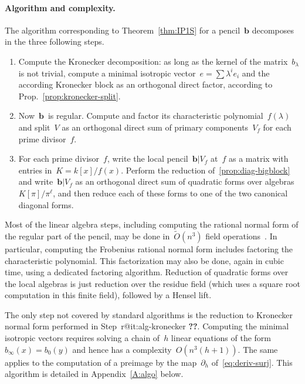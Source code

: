 \documentclass{article}%
\makeatletter
\newif\ifapx \apxtrue %
\def\labelenumi{(\roman{enumi})}
\def\itemref#1{\expandafter\ifx\csname r@#1\endcsname\relax
  {\bfseries ??}\else{\setcounter{enumi}{\ref{#1}}\labelenumi}\fi}
\def\Ot{\widetilde{O}}
\makeatother
\begin{document}
\paragraph{Algorithm and complexity.}

The algorithm corresponding to Theorem~\ref{thm:IP1S} for a
pencil~$\bm{b}$ decomposes in the three following steps.

\begin{enumerate}
\item \label{it:alg-kronecker} Compute the Kronecker decomposition: as
long as the kernel of the matrix~$b_{λ}$ is not trivial, compute a
minimal isotropic vector~$e = ∑ λ^i e_i$ and the according Kronecker
block as an orthogonal direct factor, according to
Prop.~\ref{prop:kronecker-split}.
\item \label{it:alg-factor} Now~$\bm{b}$~is regular. Compute and factor
its characteristic polynomial~$f(λ)$ and split~$V$ as an orthogonal direct
sum of primary components~$V_f$ for each prime divisor~$f$.
\item \label{it:alg-local} For each prime divisor~$f$, write the local
pencil~$\bm{b}|V_f$ at~$f$ as a matrix with entries in~$K = k[x]/f(x)$.
Perform the reduction of~\ref{prop:diag-bigblock} and write~$\bm{b}|V_f$
as an orthogonal direct sum of quadratic forms over algebras~$K[π]/π^{ℓ}$,
and then reduce each of these forms to
one of the two canonical diagonal forms.
\end{enumerate}

Most of the linear algebra steps, including computing the
rational normal form of the regular part of the pencil, may be done
in~$\Ot(n^3)$ field operations~\cite{kaltoffen11compute}.
In particular, computing the  Frobenius rational normal form
includes factoring the characteristic polynomial.
This factorization may also be done, again in cubic time,
using a dedicated factoring algorithm.
Reduction of quadratic forms over the local algebras is just
reduction over the residue field
(which uses a square root computation in this finite field),
followed by a Hensel lift.

The only step not covered by standard algorithms is the reduction to
Kronecker normal form performed in Step~\itemref{it:alg-kronecker}.
Computing the minimal isotropic vectors requires solving
a chain of~$h$ linear equations of the form~$b_{∞}(x) = b_0(y)$
and hence has a complexity~$O(n^3(h+1))$.
The same applies to the computation of a preimage by the map~$∂_h$
of~\eqref{eq:deriv-surj}.
\ifapx This algorithm is detailed in Appendix~\ref{A:algo} below. \fi
\end{document}
